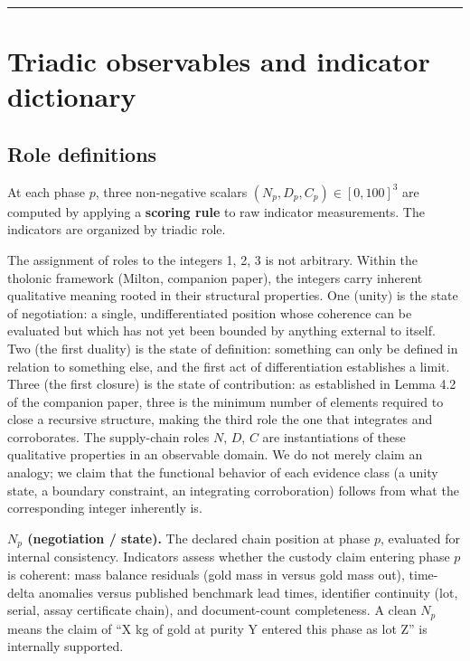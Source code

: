 \documentclass[12pt]{article}
\begin{document}
\begin{center}\rule{0.5\linewidth}{0.5pt}\end{center}

\section{Triadic observables and indicator dictionary}\label{triadic-observables-and-indicator-dictionary}

\subsection{Role definitions}\label{role-definitions}

At each phase \(p\), three non-negative scalars
\((N_p, D_p, C_p) \in [0,100]^3\) are computed by applying a
\textbf{scoring rule} to raw indicator measurements. The indicators are
organized by triadic role.

The assignment of roles to the integers 1, 2, 3 is not arbitrary. Within
the tholonic framework (Milton, companion paper), the integers carry
inherent qualitative meaning rooted in their structural properties. One
(unity) is the state of negotiation: a single, undifferentiated position
whose coherence can be evaluated but which has not yet been bounded by
anything external to itself. Two (the first duality) is the state of
definition: something can only be defined in relation to something else,
and the first act of differentiation establishes a limit. Three (the
first closure) is the state of contribution: as established in Lemma 4.2
of the companion paper, three is the minimum number of elements required
to close a recursive structure, making the third role the one that
integrates and corroborates. The supply-chain roles \(N\), \(D\), \(C\)
are instantiations of these qualitative properties in an observable
domain. We do not merely claim an analogy; we claim that the functional
behavior of each evidence class (a unity state, a boundary constraint,
an integrating corroboration) follows from what the corresponding
integer inherently is.

\textbf{\(N_p\) (negotiation / state).} The declared chain position at
phase \(p\), evaluated for internal consistency. Indicators assess
whether the custody claim entering phase \(p\) is coherent: mass balance
residuals (gold mass in versus gold mass out), time-delta anomalies
versus published benchmark lead times, identifier continuity (lot,
serial, assay certificate chain), and document-count completeness. A
clean \(N_p\) means the claim of ``X kg of gold at purity Y entered this
phase as lot Z'' is internally supported.
\end{document}
